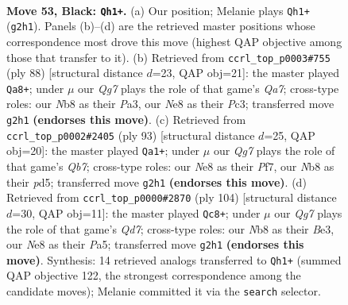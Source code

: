 \documentclass[11pt]{article}
\begin{document}
\clearpage

\begin{figure}[p]\centering
\begin{subfigure}{0.46\textwidth}\centering
\resizebox{\linewidth}{!}{%
\newchessgame
\chessboard[
  setfen={1n2n3/5k2/7p/Q7/P6K/8/3N2q1/8 b - - 6 53},
  showmover=false,
  pgfstyle=straightmove, color=movearrow, markmove={g2-h1}
]}
\caption{}
\end{subfigure}\hfill
\begin{subfigure}{0.46\textwidth}\centering
\resizebox{\linewidth}{!}{%
\newchessgame
\chessboard[
  setfen={4k3/Q7/p7/8/6bN/P1P5/2K5/5q2 w - - 12 45},
  showmover=false,
  pgfstyle=straightmove, color=movearrow, markmove={a7-a8}
]}
\caption{}
\end{subfigure}
\\[4pt]
\begin{subfigure}{0.46\textwidth}\centering
\resizebox{\linewidth}{!}{%
\newchessgame
\chessboard[
  setfen={5k2/5p2/3p4/3P4/8/P2Q4/1q6/6K1 b - - 0 47},
  showmover=false,
  pgfstyle=straightmove, color=movearrow, markmove={b2-a1}
]}
\caption{}
\end{subfigure}\hfill
\begin{subfigure}{0.46\textwidth}\centering
\resizebox{\linewidth}{!}{%
\newchessgame
\chessboard[
  setfen={6k1/3Q4/5r2/P2p3q/8/1P2B3/8/1K6 w - - 11 53},
  showmover=false,
  pgfstyle=straightmove, color=movearrow, markmove={d7-c8}
]}
\caption{}
\end{subfigure}
\caption{\textbf{Move 53, Black: \texttt{Qh1+}.} (a) Our position; Melanie plays \texttt{Qh1+} (\texttt{g2h1}). Panels (b)--(d) are the retrieved master positions whose correspondence most drove this move (highest QAP objective among those that transfer to it). (b) Retrieved from \texttt{ccrl\_top\_p0003\#755} (ply 88) [structural distance $d$=23, QAP obj=21]: the master played \texttt{Qa8+}; under $\mu$ our \emph{Qg7} plays the role of that game's \emph{Qa7}; cross-type roles: our \emph{N}b8 as their \emph{P}a3, our \emph{N}e8 as their \emph{P}c3; transferred move \texttt{g2h1} \textbf{(endorses this move)}. (c) Retrieved from \texttt{ccrl\_top\_p0002\#2405} (ply 93) [structural distance $d$=25, QAP obj=20]: the master played \texttt{Qa1+}; under $\mu$ our \emph{Qg7} plays the role of that game's \emph{Qb7}; cross-type roles: our \emph{N}e8 as their \emph{P}f7, our \emph{N}b8 as their \emph{p}d5; transferred move \texttt{g2h1} \textbf{(endorses this move)}. (d) Retrieved from \texttt{ccrl\_top\_p0000\#2870} (ply 104) [structural distance $d$=30, QAP obj=11]: the master played \texttt{Qc8+}; under $\mu$ our \emph{Qg7} plays the role of that game's \emph{Qd7}; cross-type roles: our \emph{N}b8 as their \emph{B}e3, our \emph{N}e8 as their \emph{P}a5; transferred move \texttt{g2h1} \textbf{(endorses this move)}. Synthesis: 14 retrieved analogs transferred to \texttt{Qh1+} (summed QAP objective 122, the strongest correspondence among the candidate moves); Melanie committed it via the \texttt{search} selector.}
\label{fig:thought-m105}
\end{figure}
\end{document}
